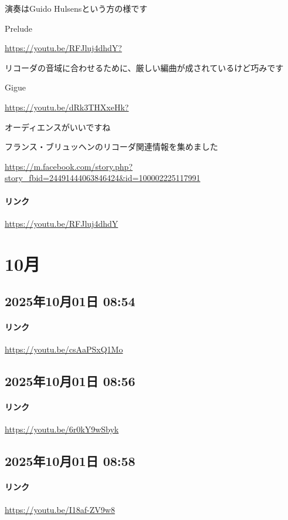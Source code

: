 演奏はGuido Hulsensという方の様です

Prelude

\url{https://youtu.be/RFJluj4dhdY?}

リコーダの音域に合わせるために、厳しい編曲が成されているけど巧みです

Gigue

\url{https://youtu.be/dRk3THXxeHk?}

オーディエンスがいいですね

フランス・ブリュッヘンのリコーダ関連情報を集めました

\url{https://m.facebook.com/story.php?story_fbid=24491444063846424&id=100002225117991}

\paragraph{リンク}
\url{https://youtu.be/RFJluj4dhdY}

\section{10月}

\subsection*{2025年10月01日 08:54}

\paragraph{リンク}
\url{https://youtu.be/csAaPSxQ1Mo}

\subsection*{2025年10月01日 08:56}

\paragraph{リンク}
\url{https://youtu.be/6r0kY9wSbyk}

\subsection*{2025年10月01日 08:58}

\paragraph{リンク}
\url{https://youtu.be/I18af-ZV9w8}

